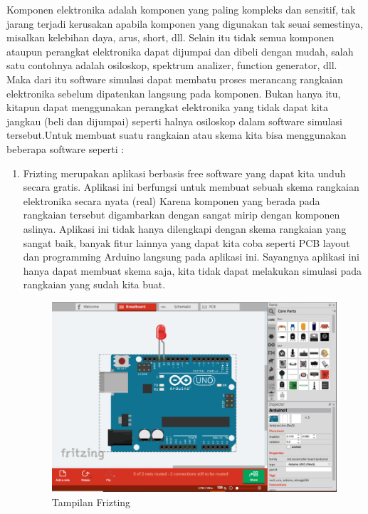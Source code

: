 \par Komponen elektronika adalah komponen yang paling kompleks dan sensitif, tak jarang terjadi kerusakan apabila komponen yang digunakan tak seuai semestinya, misalkan kelebihan daya, arus, short, dll. Selain itu tidak semua komponen ataupun perangkat elektronika dapat dijumpai dan dibeli dengan mudah, salah satu contohnya adalah osiloskop, spektrum analizer, function generator, dll.\\
Maka dari itu software simulasi dapat membatu proses merancang rangkaian elektronika sebelum dipatenkan langsung pada komponen. Bukan hanya itu, kitapun dapat menggunakan perangkat elektronika yang tidak dapat kita jangkau (beli dan dijumpai) seperti halnya osiloskop dalam software simulasi tersebut.Untuk membuat suatu rangkaian atau skema kita bisa menggunakan beberapa software seperti :
\begin{enumerate}
\item Frizting
merupakan aplikasi berbasis free software yang dapat kita unduh secara gratis. Aplikasi ini berfungsi untuk membuat sebuah skema rangkaian elektronika secara nyata (real) Karena komponen yang berada pada rangkaian tersebut digambarkan dengan sangat mirip dengan komponen aslinya. Aplikasi ini tidak hanya dilengkapi dengan skema rangkaian yang sangat baik, banyak fitur lainnya yang dapat kita coba seperti PCB layout dan programming Arduino langsung pada aplikasi ini. Sayangnya aplikasi ini hanya dapat membuat skema saja, kita tidak dapat melakukan simulasi pada rangkaian yang sudah kita buat.
\begin{figure}[H]
\centering
\includegraphics[width=1.1\textwidth]{figures/frizting1.png}
\caption{Tampilan Frizting  }
\label{print}
\end{figure}
    

\end{enumerate}
